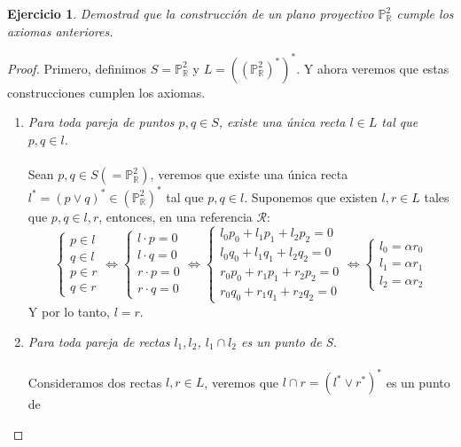 \documentclass[12pt,a4paper]{article}
\newcommand{\real}{\mathbb{R}}
\newcommand{\Po}{\mathbb{P}}
\newcommand{\dualpar}[1]{\left(#1\right)^\ast}
\newcommand{\dual}[1]{#1^\ast}
\DeclareMathOperator{\join}{\vee}
\theoremstyle{break}
\newtheorem{ej}{Ejercicio}
\newtheorem*{proof}{Solución}
\begin{document}
\begin{ej}\label{ej:1}
	Demostrad que la construcción de un plano proyectivo $\Po^2_{\real}$ cumple los
	axiomas anteriores.
\end{ej}
\begin{proof}
	Primero, definimos $S = \Po_\real^2$ y
	$L = \dualpar{\left(\Po^2_\real\right)^\ast}$. Y ahora veremos que estas
	construcciones cumplen los axiomas.
	\begin{enumerate}[\bf {A}1)]
		\item \textit{Para toda pareja de puntos $p,q \in S$, existe una única
			recta $l \in L$ tal que $p, q \in l$.} \\ \\
			Sean $p, q \in S (= \Po^2_\real)$, veremos que existe una única
			recta $\dual{l} = (p \join q)^* \in \dualpar{\Po^2_\real}$ tal
			que $p,q \in l$. Suponemos que existen $l,r \in L$ tales que
			$p,q \in l,r$, entonces, en una referencia $\mathcal{R}$:
			\[
				\begin{cases}
					p \in l \\ q \in l \\ p \in r \\ q \in r
				\end{cases} \iff \begin{cases}
					l \cdot p = 0 \\ l \cdot q = 0 \\
					r \cdot p = 0 \\ r \cdot q = 0
				\end{cases} \iff \begin{cases}
					l_0p_0 + l_1p_1 + l_2p_2 = 0 \\
					l_0q_0 + l_1q_1 + l_2q_2 = 0 \\
					r_0p_0 + r_1p_1 + r_2p_2 = 0 \\
					r_0q_0 + r_1q_1 + r_2q_2 = 0
				\end{cases} \iff \begin{cases}
					l_0 = \alpha r_0 \\
					l_1 = \alpha r_1 \\
					l_2 = \alpha r_2
				\end{cases}
			\]
			Y por lo tanto, $l = r$. \\
		\item \textit{Para toda pareja de rectas $l_1, l_2$, $l_1 \cap l_2$
			es un punto de S.} \\ \\
			Consideramos dos rectas $l, r \in L$, veremos que
			$l \cap r = \dualpar{\dual{l} \join \dual{r}}$ es un punto de

\end{enumerate}
\end{proof}
\end{document}
